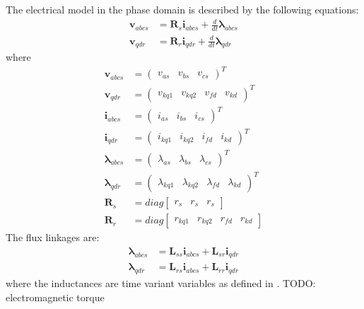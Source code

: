 The electrical model in the phase domain is described by the following equations:
%
\begin{align}
  \mathbf{v}_{abcs} &= \mathbf{R}_s \mathbf{i}_{abcs} + \frac{d}{dt} \boldsymbol{\lambda}_{abcs} \\
  \mathbf{v}_{qdr} &= \mathbf{R}_r \mathbf{i}_{qdr} + \frac{d}{dt}  \boldsymbol{\lambda}_{qdr}
\end{align}
%
where
%
\begin{align}
  \mathbf{v}_{abcs} &= 
  \begin{pmatrix}
    v_{as} & v_{bs} & v_{cs}
  \end{pmatrix}^T \\
  \mathbf{v}_{qdr} &= 
  \begin{pmatrix}
    v_{kq1} & v_{kq2} & v_{fd} & v_{kd} 
  \end{pmatrix}^T \\
  \mathbf{i}_{abcs} &= 
  \begin{pmatrix}
    i_{as} & i_{bs} & i_{cs}
  \end{pmatrix}^T \\
  \mathbf{i}_{qdr} &= 
  \begin{pmatrix}
    i_{kq1} & i_{kq2} & i_{fd} & i_{kd} 
  \end{pmatrix}^T \\
  \boldsymbol{\lambda}_{abcs} &= 
  \begin{pmatrix}
    \lambda_{as} & \lambda_{bs} & \lambda_{cs}
  \end{pmatrix}^T \\
  \boldsymbol{\lambda}_{qdr} &= 
  \begin{pmatrix}
    \lambda_{kq1} & \lambda_{kq2} & \lambda_{fd} & \lambda_{kd} 
  \end{pmatrix}^T \\
  \mathbf{R}_s &= diag
  \begin{bmatrix}
    r_s & r_s & r_s 
  \end{bmatrix} \\
  \mathbf{R}_r &= diag
  \begin{bmatrix}
    r_{kq1} & r_{kq2} & r_{fd} & r_{kd}
  \end{bmatrix}
\end{align}
%
The flux linkages are:
%
\begin{align}
  \boldsymbol{\lambda}_{abcs} &= \mathbf{L}_{ss} \mathbf{i}_{abcs} + \mathbf{L}_{sr} \mathbf{i}_{qdr}  \\
  \boldsymbol{\lambda}_{qdr} &= \mathbf{L}_{rs} \mathbf{i}_{abcs} + \mathbf{L}_{rr} \mathbf{i}_{qdr}
\end{align}
%
where the inductances are time variant variables as defined in \cite{krause2002sudhoff}.
TODO: electromagnetic torque

